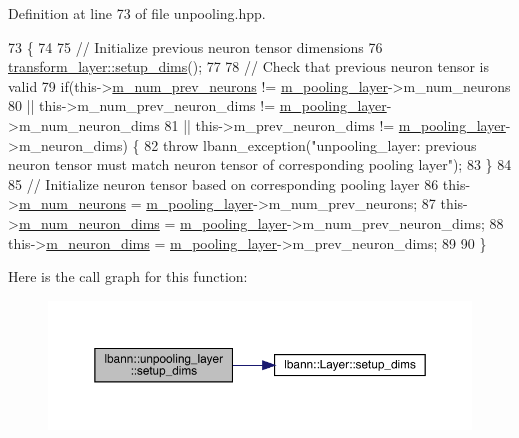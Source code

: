 Definition at line 73 of file unpooling.\+hpp.


\begin{DoxyCode}
73                              \{
74 
75     \textcolor{comment}{// Initialize previous neuron tensor dimensions}
76     \hyperlink{classlbann_1_1Layer_a90fce1b06c1f2abb480e18cfe08a9746}{transform\_layer::setup\_dims}();
77 
78     \textcolor{comment}{// Check that previous neuron tensor is valid}
79     \textcolor{keywordflow}{if}(this->\hyperlink{classlbann_1_1Layer_ac7b30f4e28d58204bfcbb76886f9136d}{m\_num\_prev\_neurons} != \hyperlink{classlbann_1_1unpooling__layer_ab15a8b0680685f80c7d995e617e97a9a}{m\_pooling\_layer}->m\_num\_neurons
80        || this->m\_num\_prev\_neuron\_dims != \hyperlink{classlbann_1_1unpooling__layer_ab15a8b0680685f80c7d995e617e97a9a}{m\_pooling\_layer}->m\_num\_neuron\_dims
81        || this->m\_prev\_neuron\_dims != \hyperlink{classlbann_1_1unpooling__layer_ab15a8b0680685f80c7d995e617e97a9a}{m\_pooling\_layer}->m\_neuron\_dims) \{
82       \textcolor{keywordflow}{throw} lbann\_exception(\textcolor{stringliteral}{"unpooling\_layer: previous neuron tensor must match neuron tensor of
       corresponding pooling layer"});
83     \}
84 
85     \textcolor{comment}{// Initialize neuron tensor based on corresponding pooling layer}
86     this->\hyperlink{classlbann_1_1Layer_a6b5ebc8a7d9329d8a773ed787e7b41d8}{m\_num\_neurons} = \hyperlink{classlbann_1_1unpooling__layer_ab15a8b0680685f80c7d995e617e97a9a}{m\_pooling\_layer}->m\_num\_prev\_neurons;
87     this->\hyperlink{classlbann_1_1Layer_adfd6178d21498c9095cd947ae1eb2d6a}{m\_num\_neuron\_dims} = \hyperlink{classlbann_1_1unpooling__layer_ab15a8b0680685f80c7d995e617e97a9a}{m\_pooling\_layer}->m\_num\_prev\_neuron\_dims;
88     this->\hyperlink{classlbann_1_1Layer_abb34bb8031f57a483e2e327a5f229f48}{m\_neuron\_dims} = \hyperlink{classlbann_1_1unpooling__layer_ab15a8b0680685f80c7d995e617e97a9a}{m\_pooling\_layer}->m\_prev\_neuron\_dims;
89 
90   \}
\end{DoxyCode}
Here is the call graph for this function\+:\nopagebreak
\begin{figure}[H]
\begin{center}
\leavevmode
\includegraphics[width=350pt]{classlbann_1_1unpooling__layer_a7fe47a0c90958329efb79aee49d6247f_cgraph}
\end{center}
\end{figure}
\mbox{\label{classlbann_1_1unpooling__layer_a32da9e26ce50aa3df3ecc52691bd5e4f}} 
